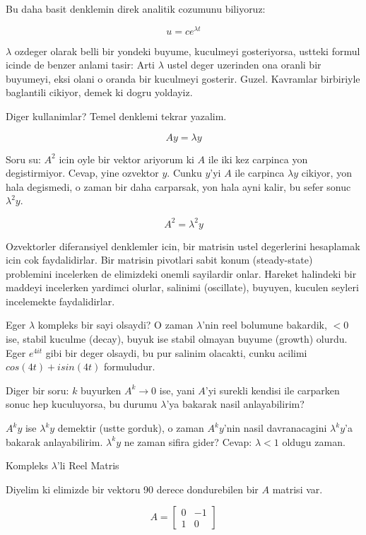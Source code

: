 \documentclass[12pt,fleqn]{article}\usepackage{../common}
\begin{document}
Bu daha basit denklemin direk analitik cozumunu biliyoruz:

\[ u = ce^{\lambda t} \]

$\lambda$ ozdeger olarak belli bir yondeki buyume, kuculmeyi gosteriyorsa,
ustteki formul icinde de benzer anlami tasir: Arti $\lambda$ ustel deger
uzerinden ona oranli bir buyumeyi, eksi olani o oranda bir kuculmeyi
gosterir. Guzel. Kavramlar birbiriyle baglantili cikiyor, demek ki dogru
yoldayiz.

Diger kullanimlar? Temel denklemi tekrar yazalim. 

\[ Ay = \lambda y \]

Soru su: $A^2$ icin oyle bir vektor ariyorum ki $A$ ile iki kez carpinca
yon degistirmiyor. Cevap, yine ozvektor $y$. Cunku $y$'yi $A$ ile carpinca
$\lambda y$ cikiyor, yon hala degismedi, o zaman bir daha carparsak, yon
hala ayni kalir, bu sefer sonuc $\lambda^2y$.

\[ A^2 = \lambda^2 y \]

Ozvektorler diferansiyel denklemler icin, bir matrisin ustel degerlerini
hesaplamak icin cok faydalidirlar. Bir matrisin pivotlari sabit konum
(steady-state) problemini incelerken de elimizdeki onemli sayilardir
onlar. Hareket halindeki bir maddeyi incelerken yardimci olurlar, salinimi
(oscillate), buyuyen, kuculen seyleri incelemekte faydalidirlar.

Eger $\lambda$ kompleks bir sayi olsaydi? O zaman $\lambda$'nin reel
bolumune bakardik, $< 0$ ise, stabil kuculme (decay), buyuk ise stabil
olmayan buyume (growth) olurdu. Eger $e^{4it}$ gibi bir deger olsaydi, bu
pur salinim olacakti, cunku acilimi $cos(4t) + isin(4t)$ formuludur.

Diger bir soru: $k$ buyurken $A^k \to 0$ ise, yani $A$'yi surekli kendisi
ile carparken sonuc hep kuculuyorsa, bu durumu $\lambda$'ya bakarak nasil
anlayabilirim? 

$A^ky$ ise $\lambda^ky$ demektir (ustte gorduk), o zaman $A^ky$'nin nasil
davranacagini $\lambda^ky$'a bakarak anlayabilirim. $\lambda^ky$ ne zaman
sifira gider? Cevap: $\lambda < 1$ oldugu zaman.

Kompleks $\lambda$'li Reel Matris

Diyelim ki elimizde bir vektoru 90 derece dondurebilen bir $A$ matrisi
var. 

\[ 
A = 
\left[
\begin{array}{rr}
0 & -1 \\
1 & 0
\end{array}
\right]
 \]
\end{document}
